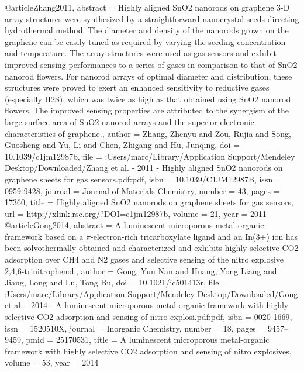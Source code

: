 @article{Zhang2011,
abstract = {Highly aligned SnO2 nanorods on graphene 3-D array structures were synthesized by a straightforward nanocrystal-seeds-directing hydrothermal method. The diameter and density of the nanorods grown on the graphene can be easily tuned as required by varying the seeding concentration and temperature. The array structures were used as gas sensors and exhibit improved sensing performances to a series of gases in comparison to that of SnO2 nanorod flowers. For nanorod arrays of optimal diameter and distribution, these structures were proved to exert an enhanced sensitivity to reductive gases (especially H2S), which was twice as high as that obtained using SnO2 nanorod flowers. The improved sensing properties are attributed to the synergism of the large surface area of SnO2 nanorod arrays and the superior electronic characteristics of graphene.},
author = {Zhang, Zhenyu and Zou, Rujia and Song, Guosheng and Yu, Li and Chen, Zhigang and Hu, Junqing},
doi = {10.1039/c1jm12987b},
file = {:Users/marc/Library/Application Support/Mendeley Desktop/Downloaded/Zhang et al. - 2011 - Highly aligned SnO2 nanorods on graphene sheets for gas sensors.pdf:pdf},
isbn = {10.1039/C1JM12987B},
issn = {0959-9428},
journal = {Journal of Materials Chemistry},
number = {43},
pages = {17360},
title = {{Highly aligned SnO2 nanorods on graphene sheets for gas sensors}},
url = {http://xlink.rsc.org/?DOI=c1jm12987b},
volume = {21},
year = {2011}
}
@article{Gong2014,
abstract = {A luminescent microporous metal-organic framework based on a $\pi$-electron-rich tricarboxylate ligand and an In(3+) ion has been solvothermally obtained and characterized and exhibits highly selective CO2 adsorption over CH4 and N2 gases and selective sensing of the nitro explosive 2,4,6-trinitrophenol.},
author = {Gong, Yun Nan and Huang, Yong Liang and Jiang, Long and Lu, Tong Bu},
doi = {10.1021/ic501413r},
file = {:Users/marc/Library/Application Support/Mendeley Desktop/Downloaded/Gong et al. - 2014 - A luminescent microporous metal-organic framework with highly selective CO2 adsorption and sensing of nitro explosi.pdf:pdf},
isbn = {0020-1669},
issn = {1520510X},
journal = {Inorganic Chemistry},
number = {18},
pages = {9457--9459},
pmid = {25170531},
title = {{A luminescent microporous metal-organic framework with highly selective CO2 adsorption and sensing of nitro explosives}},
volume = {53},
year = {2014}
}
